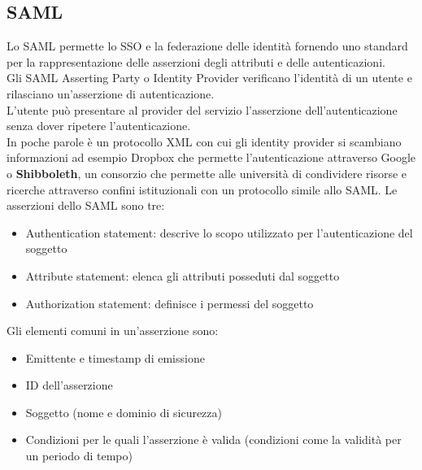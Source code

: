 \subsection{SAML}
Lo \acrfull{SAML} permette lo \acrshort{SSO} e la federazione delle identità fornendo uno standard per la rappresentazione delle asserzioni degli attributi e delle autenticazioni.\\
Gli \acrshort{SAML} Asserting Party o Identity Provider verificano l'identità di un utente e rilasciano un'asserzione di autenticazione.\\
L'utente può presentare al provider del servizio l'asserzione dell'autenticazione senza dover ripetere l'autenticazione.\\
In poche parole è un protocollo \acrfull{XML} con cui gli identity provider si scambiano informazioni ad esempio Dropbox che permette l'autenticazione attraverso Google o \textbf{Shibboleth}, un consorzio che permette alle università di condividere risorse e ricerche attraverso confini istituzionali con un protocollo simile allo \acrshort{SAML}.
Le asserzioni dello \acrshort{SAML} sono tre:
\begin{itemize}[noitemsep]
    \item Authentication statement: descrive lo scopo utilizzato per l'autenticazione del soggetto
    \item Attribute statement: elenca gli attributi posseduti dal soggetto
    \item Authorization statement: definisce i permessi del soggetto
\end{itemize}
Gli elementi comuni in un'asserzione sono:
\begin{itemize}[noitemsep]
    \item Emittente e timestamp di emissione
    \item ID dell'asserzione
    \item Soggetto (nome e dominio di sicurezza)
    \item Condizioni per le quali l'asserzione è valida (condizioni come la validità per un periodo di tempo)
\end{itemize}



